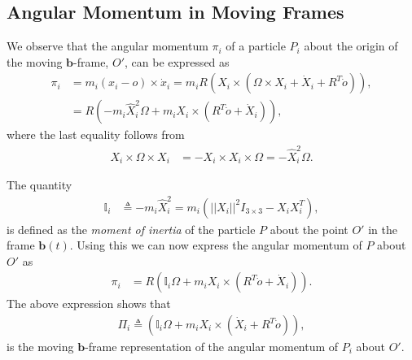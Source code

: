 \documentclass[graybox,envcountchap,sectrefs]{svmonoMuga}
\begin{document}
\subsection{Angular Momentum in Moving Frames}\label{Secn:AngularMomentumMF}
We observe that the angular momentum $\pi_i$ of a particle $P_i$ about the origin of the moving $\mathbf{b}$-frame, $O'$, can be expressed as 
\begin{align*}
\pi_i&= m_i(x_i-o)\times \dot{x}_i=m_iR\left(X_i\times (\Omega\times X_i+\dot{X}_i+R^T\dot{o})\right),\\
&=R\left(-m_i\widehat{X}_i^2\Omega+m_iX_i\times( R^T\dot{o}+ \dot{X}_i)\right),
\end{align*}
where the last equality follows from
\begin{align*}
 X_i\times \Omega\times X_i&=-X_i\times X_i \times \Omega= -\widehat{X}_i^2\Omega.
 \end{align*}
\begin{svgraybox}
The quantity
\begin{align}
\mathbb{I}_i &\triangleq -m_i\widehat{X}_i^2=m_i\left(||X_i||^2I_{3\times 3} - X_iX_i^T\right),\label{eq:MomentOfInertiaP}
\end{align} 
is defined as the \textit{moment of inertia} of the particle $P$ about the point $O'$ in the frame $\mathbf{b}(t)$.
Using this we can now express the angular momentum of $P$ about $O'$ as 
\begin{align}
\pi_i&= R\left(\mathbb{I}_i\Omega+m_iX_i\times( R^T\dot{o}+ \dot{X}_i)\right).\label{eq:BodyPi}
\end{align}
The above expression shows that 
\begin{align}
\Pi_i\triangleq \left(\mathbb{I}_i\Omega+m_iX_i\times(\dot{X}_i+ R^T\dot{o})\right),
\end{align}
is the moving $\mathbf{b}$-frame representation of the angular momentum of $P_i$ about $O'$.
\end{svgraybox}
\end{document}
